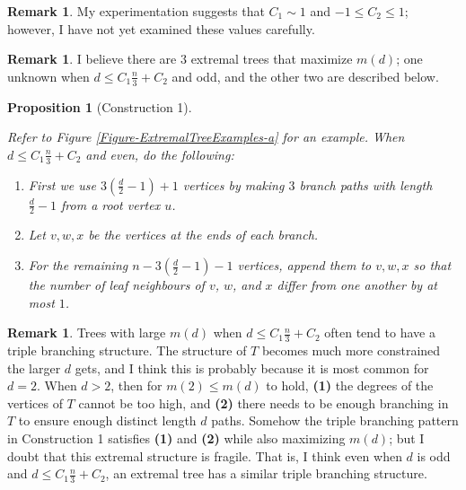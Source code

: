 \documentclass[12]{article}
\newtheorem{prop}[thm]{Proposition}
\theoremstyle{definition}
\newtheorem{rem}[thm]{Remark}
\begin{document}
	\begin{rem}
		My experimentation suggests that $C_1 \sim 1$ and $-1 \leq C_2 \leq 1$; however, I have not yet examined these values carefully.
	\end{rem}
	
	
	\begin{rem}
		I believe there are $3$ extremal trees that maximize $m(d)$; one unknown when $d \leq C_1\frac{n}{3} + C_2$ and odd, and the other two are described below.  
	\end{rem}
	
	\begin{prop}[Construction 1]\label{Construction-Small-d-Max-Multiplicity}
		
		Refer to Figure \ref{Figure-ExtremalTreeExamples-a} for an example.  When $d \leq C_1\frac{n}{3}+C_2$ and even, do the following:
		\begin{enumerate}
			\item First we use $3(\frac{d}{2} - 1) + 1$ vertices by making $3$ branch paths with length $\frac{d}{2}-1$ from a root vertex $u$.  
			
			\item Let $v,w,x$ be the vertices at the ends of each branch.  
			
			\item For the remaining $n-3(\frac{d}{2} - 1) - 1$ vertices, append them to $v,w,x$ so that the number of leaf neighbours of $v$, $w$, and $x$ differ from one another by at most $1$.
		\end{enumerate}
	\end{prop} 
	

	\begin{rem}
		Trees with large $m(d)$ when $d  \leq C_1\frac{n}{3} + C_2$ often tend to have a triple branching structure.  The structure of $T$ becomes much more constrained the larger $d$ gets, and I think this is probably because it is most common for $d = 2$.  When $d > 2$, then for $m(2) \leq m(d)$ to hold, \textbf{(1)} the degrees of the vertices of $T$ cannot be too high, and \textbf{(2)} there needs to be enough branching in $T$ to ensure enough distinct length $d$ paths.  Somehow the triple branching pattern in Construction 1 satisfies \textbf{(1)} and \textbf{(2)} while also maximizing $m(d)$; but I doubt that this extremal structure is fragile.  That is, I think even when $d$ is odd and $d  \leq C_1\frac{n}{3} + C_2$, an extremal tree has a similar triple branching structure.
	\end{rem}
	
\end{document}
